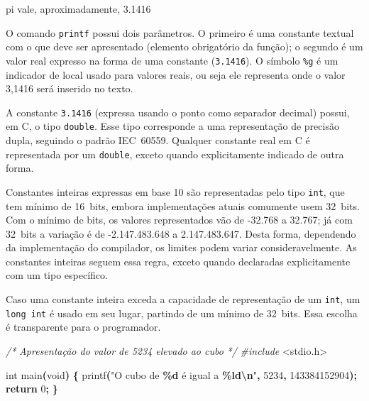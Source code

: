 \documentclass[
  11pt,
  a4paper,
]{scrbook}
\newenvironment{Shaded}{\begin{snugshade}}{\end{snugshade}}
\newcommand{\CommentTok}[1]{\textcolor[rgb]{0.56,0.35,0.01}{\textit{#1}}}
\newcommand{\ControlFlowTok}[1]{\textcolor[rgb]{0.13,0.29,0.53}{\textbf{#1}}}
\newcommand{\DataTypeTok}[1]{\textcolor[rgb]{0.13,0.29,0.53}{#1}}
\newcommand{\DecValTok}[1]{\textcolor[rgb]{0.00,0.00,0.81}{#1}}
\newcommand{\ImportTok}[1]{#1}
\newcommand{\NormalTok}[1]{#1}
\newcommand{\OperatorTok}[1]{\textcolor[rgb]{0.81,0.36,0.00}{\textbf{#1}}}
\newcommand{\PreprocessorTok}[1]{\textcolor[rgb]{0.56,0.35,0.01}{\textit{#1}}}
\newcommand{\SpecialCharTok}[1]{\textcolor[rgb]{0.81,0.36,0.00}{\textbf{#1}}}
\newcommand{\StringTok}[1]{\textcolor[rgb]{0.31,0.60,0.02}{#1}}
\begin{document}
\begin{Shaded}
\begin{Highlighting}[]
\NormalTok{pi vale, aproximadamente, 3.1416}
\end{Highlighting}
\end{Shaded}

O comando \texttt{printf} possui dois parâmetros. O primeiro é uma
constante textual com o que deve ser apresentado (elemento obrigatório
da função); o segundo é um valor real expresso na forma de uma constante
(\texttt{3.1416}). O símbolo \texttt{\%g} é um indicador de local usado
para valores reais, ou seja ele representa onde o valor 3,1416 será
inserido no texto.

A constante \texttt{3.1416} (expressa usando o ponto como separador
decimal) possui, em C, o tipo \texttt{double}. Esse tipo corresponde a
uma representação de precisão dupla, seguindo o padrão IEC~60559.
Qualquer constante real em C é representada por um \texttt{double},
exceto quando explicitamente indicado de outra forma.

Constantes inteiras expressas em base 10 são representadas pelo tipo
\texttt{int}, que tem mínimo de 16~bits, embora implementações atuais
comumente usem 32~bits. Com o mínimo de bits, os valores representados
vão de -32.768 a 32.767; já com 32~bits a variação é de -2.147.483.648 a
2.147.483.647. Desta forma, dependendo da implementação do compilador,
os limites podem variar consideravelmente. As constantes inteiras seguem
essa regra, exceto quando declaradas explicitamente com um tipo
específico.

Caso uma constante inteira exceda a capacidade de representação de um
\texttt{int}, um \texttt{long\ int} é usado em seu lugar, partindo de um
mínimo de 32~bits. Essa escolha é transparente para o programador.

\begin{Shaded}
\begin{Highlighting}[]
\CommentTok{/*}
\CommentTok{Apresentação do valor de 5234 elevado ao cubo}
\CommentTok{*/}
\PreprocessorTok{\#include }\ImportTok{\textless{}stdio.h\textgreater{}}

\DataTypeTok{int}\NormalTok{ main}\OperatorTok{(}\DataTypeTok{void}\OperatorTok{)} \OperatorTok{\{}
\NormalTok{    printf}\OperatorTok{(}\StringTok{"O cubo de }\SpecialCharTok{\%d}\StringTok{ é igual a }\SpecialCharTok{\%ld\textbackslash{}n}\StringTok{"}\OperatorTok{,} \DecValTok{5234}\OperatorTok{,} \DecValTok{143384152904}\OperatorTok{);}
    \ControlFlowTok{return} \DecValTok{0}\OperatorTok{;}
\OperatorTok{\}}
\end{Highlighting}
\end{Shaded}
\end{document}

